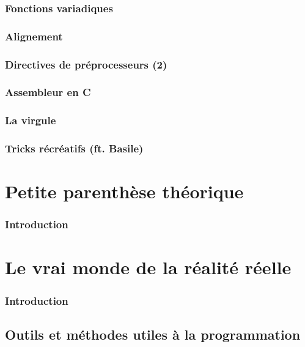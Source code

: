 \documentclass{minitelreport}
\begin{document}
\begin{refsection}
		\section{Fonctions variadiques}
		
		\section{Alignement}
		
		\section{Directives de préprocesseurs (2)}
		
		\section{Assembleur en C}
		
		\section{La virgule}
		
		\section{Tricks récréatifs (ft. Basile)}
		
\part{Petite parenthèse théorique}
	\section*{Introduction}
	
\part{Le vrai monde de la réalité réelle}
	\section*{Introduction}
	
	\chapter{Outils et méthodes utiles à la programmation}

\end{refsection}
\end{document}
